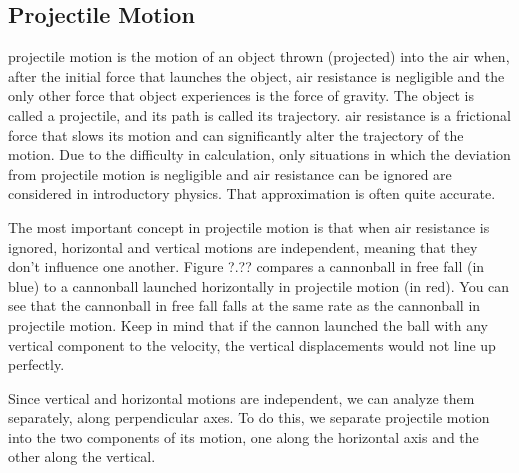 \documentclass[main-physics.tex]{subfiles}
\begin{document}
\subsection{Projectile Motion} \label{tMF7JY}

\Gls{projectile motion} is the motion of an object thrown (projected) into the air when, after the initial force that launches the object, air resistance is negligible and the only other force that object experiences is the force of gravity. The object is called a \gls{projectile}, and its path is called its \gls{trajectory}. \Gls{air resistance} is a frictional force that slows its motion and can significantly alter the trajectory of the motion. Due to the difficulty in calculation, only situations in which the deviation from projectile motion is negligible and air resistance can be ignored are considered in introductory physics. That approximation is often quite accurate.

\vspace{1em}

The most important concept in projectile motion is that when air resistance is ignored, horizontal and vertical motions are independent, meaning that they don't influence one another. Figure ?.?? compares a cannonball in free fall (in blue) to a cannonball launched horizontally in projectile motion (in red). You can see that the cannonball in free fall falls at the same rate as the cannonball in projectile motion. Keep in mind that if the cannon launched the ball with any vertical component to the velocity, the vertical displacements would not line up perfectly.

\vspace{1em}

Since vertical and horizontal motions are independent, we can analyze them separately, along perpendicular axes. To do this, we separate projectile motion into the two components of its motion, one along the horizontal axis and the other along the vertical.
\end{document}
